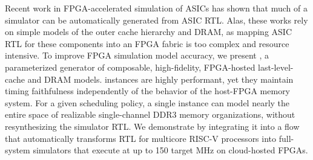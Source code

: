 Recent work in FPGA-accelerated simulation of ASICs has shown that much
of a simulator can be automatically generated from ASIC RTL.  Alas, these works rely on simple models of
the outer cache hierarchy and DRAM, as
mapping ASIC RTL for these components into an FPGA fabric is too
complex and resource intensive.  To improve FPGA simulation model
accuracy, we present \PNAME, a
parameterized generator of composable, high-fidelity, FPGA-hosted
last-level-cache and DRAM models. \PNAME instances are highly
performant, yet they maintain timing faithfulness independently of the
behavior of the host-FPGA memory system.
For a given scheduling policy, a single \PNAME instance can model
nearly the entire space of realizable single-channel DDR3 memory
organizations, without resynthesizing the simulator RTL.
We demonstrate \PNAME by integrating it into a flow that automatically
transforms RTL for multicore RISC-V processors into full-system
simulators that execute at up to 150 target MHz on cloud-hosted FPGAs.

